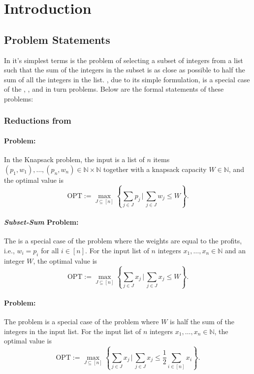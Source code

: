 \section{Introduction}
\subsection{Problem Statements}
In it's simplest terms \Partition is the problem of selecting a subset of integers from a list such that the sum of the integers in the subset is as close as possible to half the sum of all the integers in the list. \Partition, due to its simple formulation, is a special case of the \MultPart, \SubsetSum, and in turn \Knapsack problems. 
Below are the formal statements of these problems:

\subsubsection{Reductions from \Knapsack}

\paragraph{\Knapsack Problem:}
In the Knapsack problem, the input is a list of \(n\) items \\ \((p_1, w_1), \ldots, (p_n, w_n) \in \mathbb{N} \times \mathbb{N}\) together with a knapsack capacity \(W \in \mathbb{N}\), and the optimal value is
\[
    \text{OPT} := \max_{J \subseteq [n]} \left\{ \sum_{j \in J} p_j \, \bigg| \, \sum_{j \in J} w_j \leq W \right\}.
\]

\paragraph{\textit{Subset-Sum} Problem:}
The \SubsetSum is a special case of the \Knapsack problem where the weights are equal to the profits, i.e., \(w_i = p_i\) for all \(i \in [n]\). For the input list of \(n\) integers \(x_1, \ldots, x_n \in \mathbb{N}\) and an integer \(W\), the optimal value is
\[
    \text{OPT} := \max_{J \subseteq [n]} \left\{ \sum_{j \in J} x_j \, \bigg| \, \sum_{j \in J} x_j \leq W \right\}.
\]

\paragraph{\Partition Problem:}
The \Partition problem is a special case of the \SubsetSum problem where \(W\) is half the sum of the integers in the input list. For the input list of \(n\) integers \(x_1, \ldots, x_n \in \mathbb{N}\), the optimal value is
\[
    \text{OPT} := \max_{J \subseteq [n]} \left\{ \sum_{j \in J} x_j \, \bigg| \, \sum_{j \in J} x_j \leq \frac{1}{2} \sum_{i \in [n]} x_i \right\}.
\]

